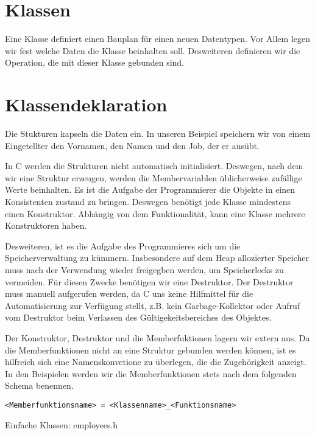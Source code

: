 
\section{Klassen}
Eine Klasse definiert einen Bauplan für einen neuen Datentypen.
Vor Allem legen wir fest welche Daten die Klasse beinhalten soll.
Desweiteren definieren wir die Operation, die mit dieser Klasse gebunden sind.


\section{Klassendeklaration}

Die Stukturen kapseln die Daten ein.
In unseren Beispiel speichern wir von einem Eingetellter den Vornamen, den Namen und den Job, der er ausübt.

In C werden die Strukturen nicht automatisch initialisiert.
Deswegen, nach dem wir eine Struktur erzeugen, werden die Membervariablen üblicherweise zufällige Werte beinhalten.
Es ist die Aufgabe der Programmierer die Objekte in einen Konsistenten zustand zu bringen.
Deswegen benötigt jede Klasse mindestens einen Konstruktor.
Abhängig von dem Funktionalität, kann eine Klasse mehrere Konstruktoren haben.

Desweiteren, ist es die Aufgabe des Programmieres sich um die Speicherverwaltung zu kümmern.
Insbesondere auf dem Heap allozierter Speicher muss nach der Verwendung wieder freigegben werden, um Speicherlecks zu vermeiden.
Für diesen Zwecke benötigen wir eine Destruktor.
Der Destruktor muss manuell aufgerufen werden, da C uns keine Hilfmittel für die Automatisierung zur Verfügung stellt, z.B. kein Garbage-Kollektor oder Aufruf vom Destruktor beim Verlassen des Gültigekeitsbereiches des Objektes.

Der Konstruktor, Destruktor und die Memberfuktionen lagern wir extern aus.
Da die Memberfunktionen nicht an eine Struktur gebunden werden können, ist es hilfreich sich eine Namenskonvetione zu überlegen, die die Zugehörigkeit anzeigt. 
In den Beispielen werden wir die Memberfunktionen stets nach dem folgenden Schema benennen.
\begin{lstlisting}
<Memberfunktionsname> = <Klassenname>_<Funktionsname>
\end{lstlisting}

\begin{code}
	\caption{Einfache Klassen: employees.h}
	\inputminted{C}{code/employees_plain/employee.h}
\end{code}



